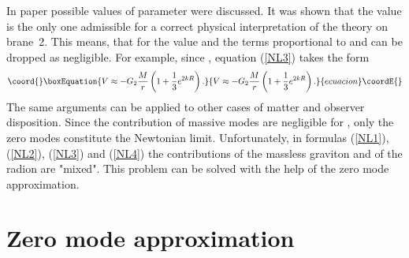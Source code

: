 \documentclass[a4paper,12pt]{article}
\begin{document}
In paper \cite{BKSV} possible values of parameter \coordHE{} were discussed. It
was shown that the value  \coordHE{} is the only one admissible for a
correct physical interpretation of the theory on brane~2. This means, that
for \coordHE{} the value \coordHE{} and the terms proportional to
\coordHE{} and \coordHE{} can be dropped as negligible. For example, since
\coordHE{}, equation (\ref{NL3}) takes the form
\begin{equation}\coord{}\boxEquation{
V\approx -G_{2}\frac{M}{r}\left(1+\frac{1}{3}e^{2kR}\right).
}{
V\approx -G_{2}\frac{M}{r}\left(1+\frac{1}{3}e^{2kR}\right).
}{ecuacion}\coordE{}\end{equation}
The same arguments can be applied to other cases of matter and observer
disposition. Since the contribution of massive modes are negligible for
\coordHE{}, only the zero modes constitute the Newtonian limit.
Unfortunately,  in formulas (\ref{NL1}), (\ref{NL2}), (\ref{NL3}) and
(\ref{NL4}) the  contributions of the  massless graviton and of the radion
are "mixed". This problem can be solved with the help of the zero mode
approximation.

\section{Zero mode approximation}
\end{document}

